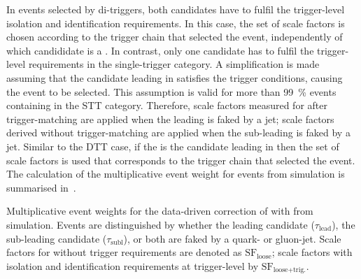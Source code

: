 In events selected by di-\tauhadvis triggers, both \tauhadvis
candidates have to fulfil the trigger-level isolation and
identification requirements. In this case, the set of scale factors is
chosen according to the trigger chain that selected the event,
independently of which candididate is a \faketauhadvis. In contrast,
only one \tauhadvis candidate has to fulfil the trigger-level
requirements in the single-\tauhadvis trigger category. A
simplification is made assuming that the \tauhadvis candidate leading
in \pT satisfies the trigger conditions, causing the event to be
selected. This assumption is valid for more than \SI{99}{\percent}
\ttbar events containing \faketauhadvis in the STT
category. Therefore, scale factors measured for \faketauhadvis after
trigger-matching are applied when the leading \tauhadvis is faked by a
jet; scale factors derived without trigger-matching are applied when
the sub-leading \tauhadvis is faked by a jet. Similar to the DTT case,
if the \faketauhadvis is the \tauhadvis candidate leading in \pT then
the set of scale factors is used that corresponds to the trigger chain
that selected the event. The calculation of the multiplicative event
weight for \ttbarFakes events from simulation is summarised
in~.

\begin{table}[htbp]
  \centering

  \caption{Multiplicative event weights for the data-driven correction
    of \ttbar with \faketauhadvis from simulation. Events are
    distinguished by whether the leading \tauhadvis candidate
    ($\tau_{\text{lead}}$), the sub-leading \tauhadvis candidate
    ($\tau_{\text{subl}}$), or both are faked by a quark- or
    gluon-jet. Scale factors for \faketauhadvis without trigger
    requirements are denoted as $\text{SF}_{\text{loose}}$; scale
    factors with isolation and identification requirements at
    trigger-level by $\text{SF}_\text{loose+trig.}$.}%
  \label{tab:ttbarSF_application_rule}

  \resizebox{\textwidth}{!}{
    
  }
\end{table}



